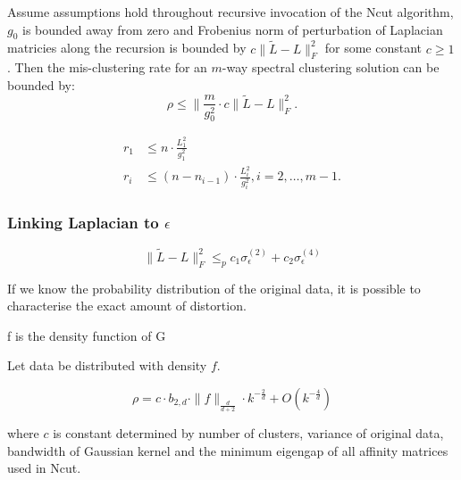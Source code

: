 \documentclass{beamer}
\begin{document}
\begin{frame}
\frametitle{}

\begin{Theorem}
Assume assumptions hold throughout recursive invocation of the Ncut algorithm, $g_0$ is bounded away from zero and Frobenius norm of perturbation of Laplacian matricies along the recursion is bounded by $c\| \tilde{L} - L \|_F^2$ for some constant $c \geq 1$. Then the mis-clustering rate for an $m$-way spectral clustering solution can be bounded by:
  \begin{equation}
    \label{eq:rho1}
    \rho \leq \| \frac{m}{g_0^2} \cdot c \| \tilde{L} - L \|^2_F.
  \end{equation}

\end{Theorem}

\pause

\begin{align*}
r_1 & \leq n \cdot \frac{L_1^2}{g_1^2} \\
r_i & \leq (n - n_{i-1}) \cdot \frac{L_i^2}{g_i^2}, i = 2, \ldots, {m-1}.  
\end{align*}


\end{frame}


\begin{frame}
\frametitle{Linking Laplacian to $\epsilon$}  

\begin{theorem}

  \begin{equation}
    \label{eq:6}
\| \tilde{L} - L \|^2_F \leq_p c_1 \sigma_{\epsilon}^{(2)} + c_2 \sigma_{\epsilon}^{(4)}      
  \end{equation}

\end{theorem}



\end{frame}

\begin{frame}
If we know the probability distribution of the original data, it is possible to characterise the exact amount of distortion. 

f is the density function of G  
\begin{theorem}
  
Let data be distributed with density $f$. 

\begin{equation*}
  \label{eq:kaspBound}
  \rho = c \cdot b_{2,d} \cdot \|f\|_{\frac{d}{d+2}} \cdot k^{-\frac{2}{d}} + O(k^{-\frac{4}{d}})
\end{equation*}

where $c$ is constant determined by number of clusters, variance of original data, bandwidth of Gaussian kernel and the minimum eigengap of all affinity matrices used in Ncut. 

\end{theorem}

\end{frame}
\end{document}
